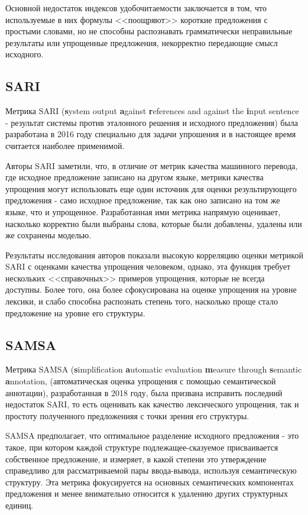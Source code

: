 Основной недостаток индексов удобочитаемости заключается в том, что используемые в них формулы <<поощряют>> короткие предложения с простыми словами, но не способны распознавать грамматически неправильные результаты или упрощенные предложения, некорректно передающие смысл исходного.

\subsection{SARI}

Метрика SARI (\textbf{s}ystem output \textbf{a}gainst \textbf{r}eferences and against the \textbf{i}nput sentence - результат системы против эталонного решения и исходного предложения) была разработана в 2016 году специально для задачи упрошения и в настоящее время считается наиболее применимой\cite{xu_optimizing_2016}.

Авторы SARI заметили, что, в отличие от метрик качества машинного перевода, где исходное предложение записано на другом языке, метрики качества упрощения могут использовать еще один источник для оценки результирующего предложения - само исходное предложение, так как оно записано на том же языке, что и упрощенное. Разработанная ими метрика напрямую оценивает, насколько корректно были выбраны слова, которые были добавлены, удалены или же сохранены моделью.

Результаты исследования авторов показали высокую корреляцию оценки метрикой SARI с оценками качества упрощения человеком, однако, эта функция требует нескольких <<справочных>> примеров упрощения, которые не всегда доступны. Более того, она более сфокусирована на оценке упрощения на уровне лексики, и слабо способна распознать степень того, насколько проще стало предложение на уровне его структуры.

\subsection{SAMSA}

Метрика SAMSA (\textbf{s}implification \textbf{a}utomatic evaluation \textbf{m}easure through \textbf{s}emantic \textbf{a}nnotation, (автоматическая оценка упрощения с помощью семантической аннотации), разработанная в 2018 году, была призвана исправить последний недостаток SARI, то есть оценивать как качество лексического упрощения, так и простоту полученного предложенияя с точки зрения его структуры\cite{sulem_semantic_2018}.

SAMSA предполагает, что оптимальное разделение исходного предложения - это такое, при котором каждой структуре подлежащее-сказуемое присваивается собственное предложение, и измеряет, в какой степени это утверждение справедливо для рассматриваемой пары ввода-вывода, используя семантическую структуру. Эта метрика фокусируется на основных семантических компонентах предложения и менее внимательно относится к удалению других структурных единиц.

